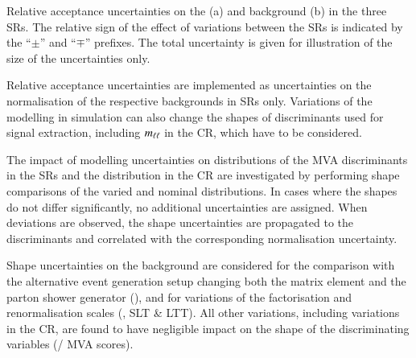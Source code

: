 \begin{table}[htbp]
  \centering

  \caption{Relative acceptance uncertainties on the \ZHF (a) and \ttbar
    background (b) in the three SRs. The relative sign of the effect of
    variations between the SRs is indicated by the ``$\pm$'' and ``$\mp$''
    prefixes. The total uncertainty is given for illustration of the size of the
    uncertainties only.}

  \begin{subtable}[t]{0.95\textwidth}
    \centering
    \label{tab:uncertainties_zhf_extrapol}

    
  \end{subtable}

  \vspace{10pt}

  \begin{subtable}[t]{0.95\textwidth}
    \centering
    \label{tab:uncertainties_ttbar_extrapol}

    
  \end{subtable}
\end{table}

Relative acceptance uncertainties are implemented as uncertainties on the
normalisation of the respective backgrounds in SRs only. Variations of the
modelling in simulation can also change the shapes of discriminants used for
signal extraction, including $m_{\ell\ell}$ in the \ZHF CR, which have to be considered.

The impact of modelling uncertainties on distributions of the MVA discriminants
in the SRs and the \mll distribution in the \ZHF CR are investigated by
performing shape comparisons of the varied and nominal distributions. In cases
where the shapes do not differ significantly, no additional uncertainties are
assigned.  When deviations are observed, the shape uncertainties are propagated
to the discriminants and correlated with the corresponding normalisation
uncertainty.

Shape uncertainties on the \ZHF background are considered for the comparison
with the alternative event generation setup changing both the matrix element and
the parton shower generator (\hadhad), and for variations of the factorisation
and renormalisation scales (\hadhad, \lephad SLT \& LTT). All other variations,
including variations in the \ZHF CR, are found to have negligible impact on the
shape of the discriminating variables (\mll / MVA scores).

